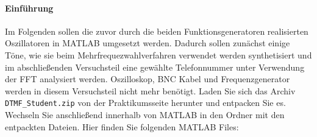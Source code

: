 \documentclass[10pt]{scrreprt}
\begin{document}
        \paragraph{Einführung}
        Im Folgenden sollen die zuvor durch die beiden Funktionsgeneratoren realisierten Oszillatoren
        in MATLAB umgesetzt werden. Dadurch sollen zunächst einige Töne, wie sie
        beim Mehrfrequezwahlverfahren verwendet werden synthetisiert und im abschließenden
        Versuchsteil eine \glqq{}gewählte\grqq{} Telefonnummer unter Verwendung der FFT analysiert werden.
        Oszilloskop, BNC Kabel und Frequenzgenerator werden in diesem Versuchsteil nicht
        mehr benötigt.
        Laden Sie sich das Archiv \texttt{DTMF\_Student.zip} von der Praktikumsseite herunter und
        entpacken Sie es. Wechseln Sie anschließend innerhalb von MATLAB in den Ordner mit
        den entpackten Dateien. Hier finden Sie folgenden MATLAB Files:
\end{document}
